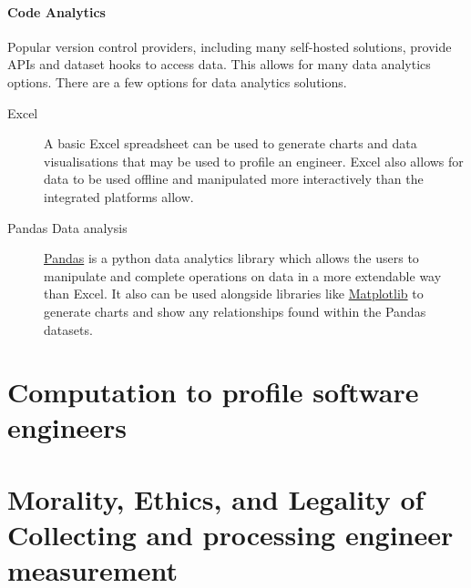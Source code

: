 \documentclass{article}
\begin{document}
        \paragraph{Code Analytics}
        Popular version control providers, including many self-hosted solutions, provide APIs and dataset hooks to access data. This allows for many data analytics options. There are a few options for data analytics solutions.
        \begin{description}
            \item[Excel] A basic Excel spreadsheet can be used to generate charts and data visualisations that may be used to profile an engineer. Excel also allows for data to be used offline and manipulated more interactively than the integrated platforms allow.
            \item[Pandas Data analysis] \href{https://pandas.pydata.org/}{Pandas} is a python data analytics library which allows the users to manipulate and complete operations on data in a more extendable way than Excel. It also can be used alongside libraries like \href{https://matplotlib.org/}{Matplotlib} to generate charts and show any relationships found within the Pandas datasets.
        \end{description}

    \section{Computation to profile software engineers}
    \section{Morality, Ethics, and Legality of Collecting and processing engineer measurement}
    
    
\end{document}
